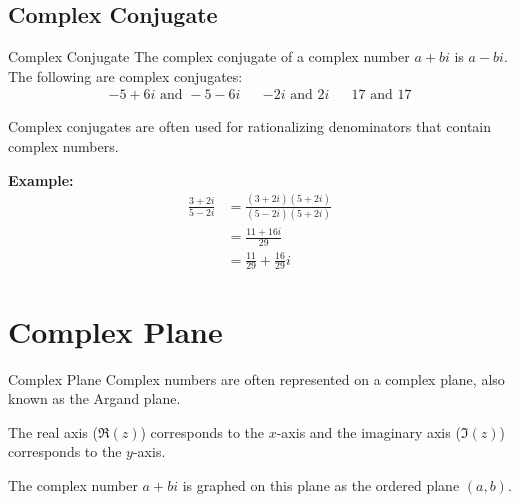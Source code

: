 \documentclass{beamer}
\begin{document}
\subsection{Complex Conjugate}
\begin{frame}{Complex Conjugate}
    The complex conjugate of a complex number $a + bi$ is $a - bi$. The following are complex conjugates:
    \begin{align*}
        -5 + 6i \text{ and } -5 -6i && -2i \text{ and } 2i && 17 \text{ and } 17
    \end{align*}
    
    Complex conjugates are often used for rationalizing denominators that contain complex numbers. \newline
    
    \textbf{Example:}
    \begin{align*}
        \frac{3 + 2i}{5 - 2i} &= \frac{(3 + 2i)(5 + 2i)}{(5 - 2i)(5 + 2i)} \\
        &= \frac{11 + 16i}{29} \\
        &= \frac{11}{29} + \frac{16}{29}i
    \end{align*}
\end{frame}

\section{Complex Plane}
\begin{frame}{Complex Plane}
    Complex numbers are often represented on a complex plane, also known as the Argand plane. \newline
    
    The real axis ($\Re(z)$) corresponds to the $x$-axis and the imaginary axis ($\Im(z)$) corresponds to the $y$-axis. \newline
    
    The complex number $a + bi$ is graphed on this plane as the ordered plane $(a, b)$.

\end{frame}
\end{document}
